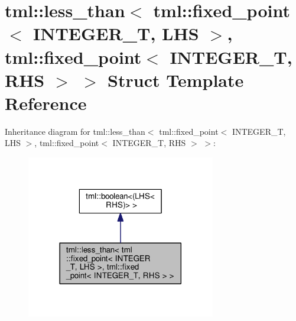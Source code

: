 \hypertarget{structtml_1_1less__than_3_01tml_1_1fixed__point_3_01_i_n_t_e_g_e_r___t_00_01_l_h_s_01_4_00_01tml9cfc672a4d03195f2374d4716976b6ab}{\section{tml\+:\+:less\+\_\+than$<$ tml\+:\+:fixed\+\_\+point$<$ I\+N\+T\+E\+G\+E\+R\+\_\+\+T, L\+H\+S $>$, tml\+:\+:fixed\+\_\+point$<$ I\+N\+T\+E\+G\+E\+R\+\_\+\+T, R\+H\+S $>$ $>$ Struct Template Reference}
\label{structtml_1_1less__than_3_01tml_1_1fixed__point_3_01_i_n_t_e_g_e_r___t_00_01_l_h_s_01_4_00_01tml9cfc672a4d03195f2374d4716976b6ab}
}


Inheritance diagram for tml\+:\+:less\+\_\+than$<$ tml\+:\+:fixed\+\_\+point$<$ I\+N\+T\+E\+G\+E\+R\+\_\+\+T, L\+H\+S $>$, tml\+:\+:fixed\+\_\+point$<$ I\+N\+T\+E\+G\+E\+R\+\_\+\+T, R\+H\+S $>$ $>$\+:
\nopagebreak
\begin{figure}[H]
\begin{center}
\leavevmode
\includegraphics[width=234pt]{structtml_1_1less__than_3_01tml_1_1fixed__point_3_01_i_n_t_e_g_e_r___t_00_01_l_h_s_01_4_00_01tmlc259b22b551bd5c63ab9c9ecc08ce658}
\end{center}
\end{figure}


